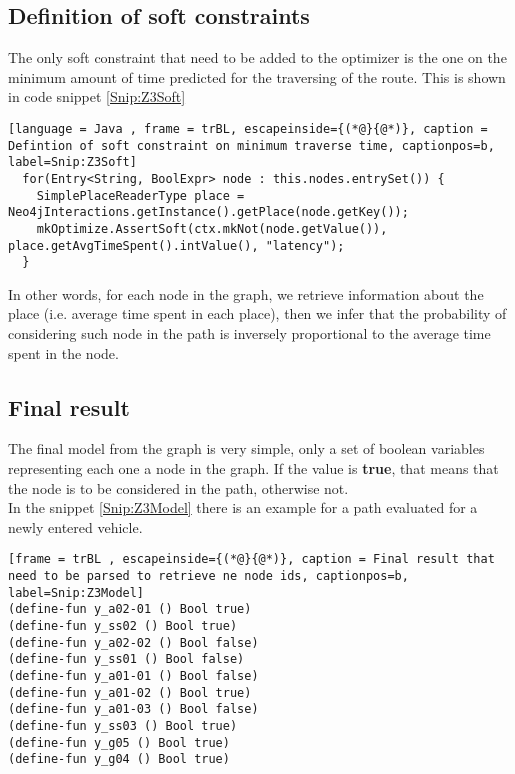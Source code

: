 \subsection{Definition of soft constraints}
The only soft constraint that need to be added to the optimizer is the one on the minimum amount of time predicted for the traversing of the route. This is shown in code snippet \ref{Snip:Z3Soft}
\begin{lstlisting}[language = Java , frame = trBL, escapeinside={(*@}{@*)}, caption = Defintion of soft constraint on minimum traverse time, captionpos=b, label=Snip:Z3Soft]
  for(Entry<String, BoolExpr> node : this.nodes.entrySet()) {
    SimplePlaceReaderType place = Neo4jInteractions.getInstance().getPlace(node.getKey());
    mkOptimize.AssertSoft(ctx.mkNot(node.getValue()), place.getAvgTimeSpent().intValue(), "latency");
  }
\end{lstlisting}
In other words, for each node in the graph, we retrieve information about the place (i.e. average time spent in each place), then we infer that the probability of considering such node in the path is inversely proportional to the average time spent in the node.

\subsection{Final result}
The final model from the graph is very simple, only a set of boolean variables representing each one a node in the graph. If the value is \textbf{true}, that means that the node is to be considered in the path, otherwise not.\\
In the snippet \ref{Snip:Z3Model} there is an example for a path evaluated for a newly entered vehicle.
\begin{lstlisting}[frame = trBL , escapeinside={(*@}{@*)}, caption = Final result that need to be parsed to retrieve ne node ids, captionpos=b, label=Snip:Z3Model]
(define-fun y_a02-01 () Bool true)
(define-fun y_ss02 () Bool true)
(define-fun y_a02-02 () Bool false)
(define-fun y_ss01 () Bool false)
(define-fun y_a01-01 () Bool false)
(define-fun y_a01-02 () Bool true)
(define-fun y_a01-03 () Bool false)
(define-fun y_ss03 () Bool true)
(define-fun y_g05 () Bool true)
(define-fun y_g04 () Bool true)
\end{lstlisting}

